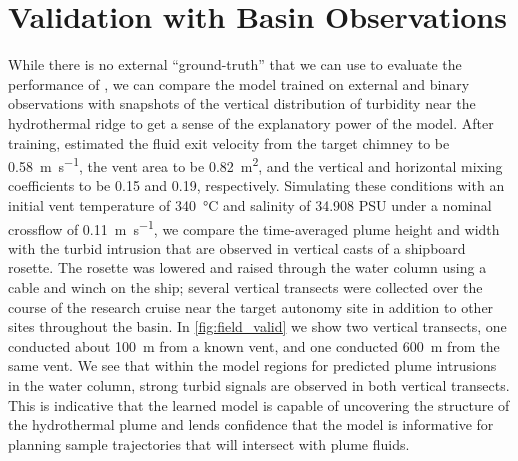 \section{\PHUMES Validation with Basin Observations}
\label{sec:field_phumes}
While there is no external ``ground-truth'' that we can use to evaluate the performance of \PHORTEX, we can compare the \PHUMES model trained on external and binary \Sentry observations with snapshots of the vertical distribution of turbidity near the hydrothermal ridge to get a sense of the explanatory power of the \PHUMES model. After training, \PHUMES estimated the fluid exit velocity from the target chimney to be \SI{0.58}{\meter\per\second}, the vent area to be \SI{0.82}{\meter\squared}, and the vertical and horizontal mixing coefficients to be 0.15 and 0.19, respectively. Simulating these conditions with an initial vent temperature of \SI{340}{\celsius} and salinity of 34.908 PSU under a nominal crossflow of \SI{0.11}{\meter\per\second}, we compare the time-averaged plume height and width with the turbid intrusion that are observed in vertical casts of a shipboard rosette. The rosette was lowered and raised through the water column using a cable and winch on the ship; several vertical transects were collected over the course of the research cruise near the target autonomy site in addition to other sites throughout the basin. In \cref{fig:field_valid} we show two vertical transects, one conducted about \SI{100}{\meter} from a known vent, and one conducted \SI{600}{\meter} from the same vent. We see that within the model regions for predicted plume intrusions in the water column, strong turbid signals are observed in both vertical transects. This is indicative that the learned \PHUMES model is capable of uncovering the structure of the hydrothermal plume and lends confidence that the model is informative for planning sample trajectories that will intersect with plume fluids.

